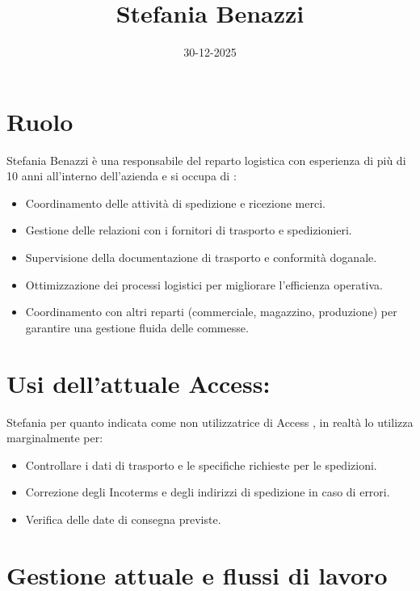 \documentclass[12pt, a4paper]{article} %
\title{Stefania Benazzi}
\date{30-12-2025}
\begin{document}
\maketitle

\section{Ruolo}
Stefania Benazzi è una responsabile del reparto logistica con esperienza di più di 10 anni all'interno dell'azienda e si occupa di :
\begin{itemize}
    \item Coordinamento delle attività di spedizione e ricezione merci.
    \item Gestione delle relazioni con i fornitori di trasporto e spedizionieri.
    \item Supervisione della documentazione di trasporto e conformità doganale.
    \item Ottimizzazione dei processi logistici per migliorare l'efficienza operativa.
    \item Coordinamento con altri reparti (commerciale, magazzino, produzione) per garantire una gestione fluida delle commesse.
\end{itemize}

\section{Usi dell'attuale Access:}
Stefania per quanto indicata come non utilizzatrice di Access , in realtà lo utilizza marginalmente per:
\begin{itemize}
    \item Controllare i dati di trasporto e le specifiche richieste per le spedizioni.
    \item Correzione degli Incoterms e degli indirizzi di spedizione in caso di errori.
    \item Verifica delle date di consegna previste.
\end{itemize}

\section{Gestione attuale e flussi di lavoro}
\end{document}
